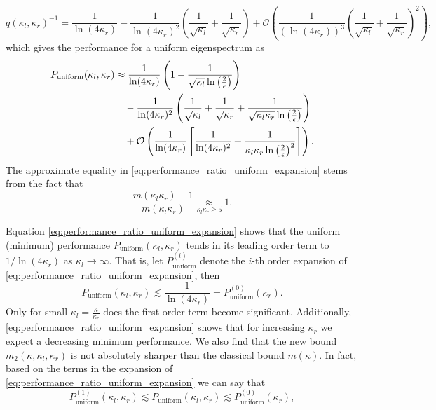 \[
    q(\kappa_l, \kappa_r)^{-1} = \frac{1}{\ln(4\kappa_r)} - \frac{1}{\ln(4\kappa_r)^2}\left(\frac{1}{\sqrt{\kappa_l}} + \frac{1}{\sqrt{\kappa_r}}\right) + \mathcal{O}\left(\frac{1}{(\ln(4\kappa_r))^3}\left(\frac{1}{\sqrt{\kappa_l}} + \frac{1}{\sqrt{\kappa_r}}\right)^2\right),
\]
which gives the performance for a uniform eigenspectrum as
\begin{align}
    P_{\text{uniform}}(\kappa_l, \kappa_r) &\approx \frac{1}{\ln(4\kappa_r)} \left(1 - \frac{1}{\sqrt{\kappa_l}\ln\left(\frac{2}{\epsilon}\right)}\right) \notag \\
    &\quad - \frac{1}{\ln(4\kappa_r)^2}\left(\frac{1}{\sqrt{\kappa_l}} + \frac{1}{\sqrt{\kappa_r}} + \frac{1}{\sqrt{\kappa_l\kappa_r}\ln\left(\frac{2}{\epsilon}\right)}\right) \notag \\
    &\quad + \mathcal{O}\left(\frac{1}{\ln(4\kappa_r)}\left[\frac{1}{\ln(4\kappa_r)^2} + \frac{1}{\kappa_l\kappa_r\ln\left(\frac{2}{\epsilon}\right)^2}\right]\right).
    \label{eq:performance_ratio_uniform_expansion}
\end{align}
The approximate equality in \cref{eq:performance_ratio_uniform_expansion} stems from the fact that
\[
    \frac{m(\kappa_l\kappa_r)-1}{m(\kappa_l\kappa_r)} \underset{\kappa_l\kappa_r \geq 5}{\approx} 1.
\]

Equation \ref{eq:performance_ratio_uniform_expansion} shows that the uniform (minimum) performance $P_{\text{uniform}}(\kappa_l, \kappa_r)$ tends in its leading order term to $1/\ln(4\kappa_r)$ as $\kappa_l \to \infty$. That is, let $P^{(i)}_{\text{uniform}}$ denote the $i$-th order expansion of \cref{eq:performance_ratio_uniform_expansion}, then
\[
    P_{\text{uniform}}(\kappa_l, \kappa_r) \lesssim \frac{1}{\ln(4\kappa_r)} = P^{(0)}_{\text{uniform}}(\kappa_r).
\]
Only for small $\kappa_l = \frac{\kappa}{\kappa_r}$ does the first order term become significant. Additionally, \cref{eq:performance_ratio_uniform_expansion} shows that for increasing $\kappa_r$ we expect a decreasing minimum performance. We also find that the new bound $m_2(\kappa,\kappa_l,\kappa_r)$ is not absolutely sharper than the classical bound $m(\kappa)$. In fact, based on the terms in the expansion of \cref{eq:performance_ratio_uniform_expansion} we can say that
\begin{equation}
    P^{(1)}_{\text{uniform}}(\kappa_l, \kappa_r) \lesssim P_{\text{uniform}}(\kappa_l, \kappa_r) \lesssim P^{(0)}_{\text{uniform}}(\kappa_r),
    \label{eq:performance_ratio_no_improvement_bounds}
\end{equation}

